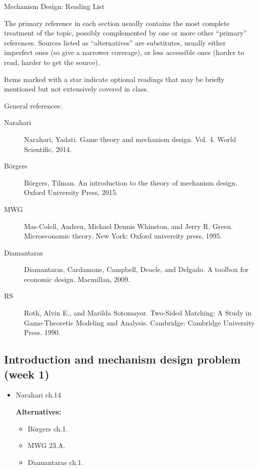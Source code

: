 \documentclass{article}
\begin{document}
\begin{center}
	{\huge Mechanism Design: Reading List}
\end{center}
\bigskip

The primary reference in each section usually contains the most complete treatment of the topic, possibly complemented by one or more other ``primary'' references. Sources listed as ``alternatives'' are substitutes, usually either imperfect ones (so give a narrower coverage), or less accessible ones (harder to read, harder to get the source). 

Items marked with a star indicate optional readings that may be briefly mentioned but not extensively covered in class.

\bigskip 

General references:
\begin{description} 
	\item[Narahari] Narahari, Yadati. Game theory and mechanism design. Vol. 4. World Scientific, 2014.
	\item[B{\"o}rgers] B{\"o}rgers, Tilman. An introduction to the theory of mechanism design. Oxford University Press, 2015.
	\item[MWG] Mas-Colell, Andreu, Michael Dennis Whinston, and Jerry R. Green. Microeconomic theory. New York: Oxford university press, 1995.
	\item[Diamantaras] Diamantaras, Cardamone, Campbell, Deacle, and Delgado. A toolbox for economic design. Macmillan, 2009.
	\item[RS] Roth, Alvin E., and Marilda Sotomayor. Two-Sided Matching: A Study in Game-Theoretic Modeling and Analysis. Cambridge: Cambridge University Press. 1990.
\end{description}
\medskip

\subsection{Introduction and mechanism design problem (week 1)}
\begin{itemize}
	\item Narahari ch.14
	
	\textbf{Alternatives:}
	\begin{itemize}
		\item B{\"o}rgers ch.1.
		\item MWG 23.A.
		\item Diamantaras ch.1.
	\end{itemize}
\end{itemize}
\end{document}

